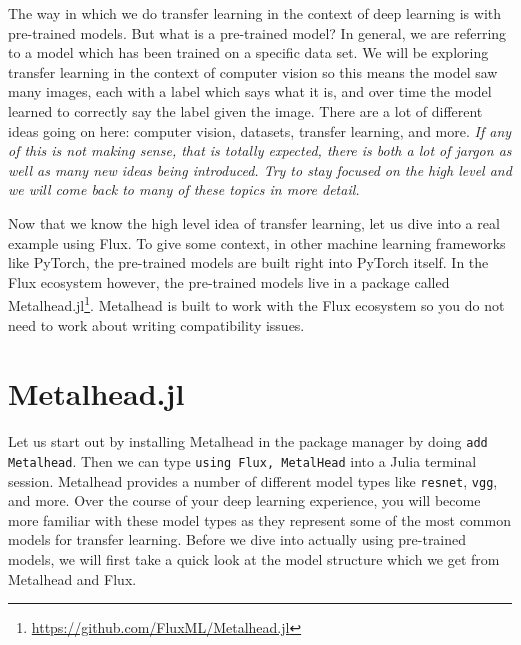\documentclass[
  notoc %
]{tufte-book}
\DeclareRobustCommand{\href}[2]{#2\footnote{\url{#1}}}
\newcommand{\passthrough}[1]{#1}
\begin{document}
The way in which we do transfer learning in the context of deep learning
is with pre-trained models. But what is a pre-trained model? In general,
we are referring to a model which has been trained on a specific data
set. We will be exploring transfer learning in the context of computer
vision so this means the model saw many images, each with a label which
says what it is, and over time the model learned to correctly say the
label given the image. There are a lot of different ideas going on here:
computer vision, datasets, transfer learning, and more. \emph{If any of
this is not making sense, that is totally expected, there is both a lot
of jargon as well as many new ideas being introduced. Try to stay
focused on the high level and we will come back to many of these topics
in more detail.}

Now that we know the high level idea of transfer learning, let us dive
into a real example using Flux. To give some context, in other machine
learning frameworks like PyTorch, the pre-trained models are built right
into PyTorch itself. In the Flux ecosystem however, the pre-trained
models live in a package called
\href{https://github.com/FluxML/Metalhead.jl}{Metalhead.jl}. Metalhead
is built to work with the Flux ecosystem so you do not need to work
about writing compatibility issues.

\hypertarget{sec:metalhead}{%
\section{Metalhead.jl}\label{sec:metalhead}}

Let us start out by installing Metalhead in the package manager by doing
\passthrough{\lstinline!add Metalhead!}. Then we can type
\passthrough{\lstinline!using Flux, MetalHead!} into a Julia terminal
session. Metalhead provides a number of different model types like
\passthrough{\lstinline!resnet!}, \passthrough{\lstinline!vgg!}, and
more. Over the course of your deep learning experience, you will become
more familiar with these model types as they represent some of the most
common models for transfer learning. Before we dive into actually using
pre-trained models, we will first take a quick look at the model
structure which we get from Metalhead and Flux.
\end{document}
